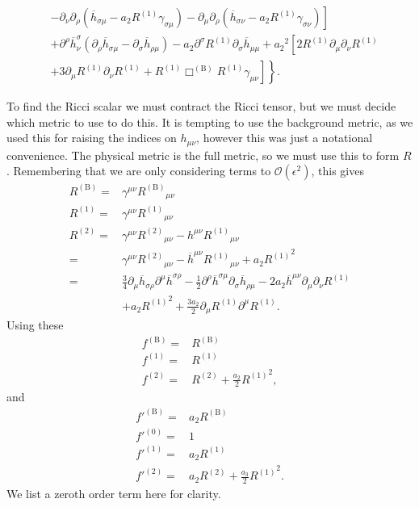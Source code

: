 \documentclass[a4paper, 11pt, titlepage, twoside]{report}
\newcommand{\recip}[1]{\ensuremath{\frac{1}{#1}}}
\newcommand{\order}[1]{\ensuremath{\mathcal{O}({#1})}}
\begin{document}
{\begin{align}
 & - \left.\left. \partial_\nu\partial_\rho\left(\overline{h}_{\sigma\mu} - a_2 R^{(1)} \gamma_{\sigma\mu}\right) - \partial_\mu\partial_\rho\left(\overline{h}_{\sigma\nu} - a_2 R^{(1)} \gamma_{\sigma\nu}\right)\right] \right. \nonumber \\
 & + \left. \partial^\rho\overline{h}^\sigma_\nu\left(\partial_\rho\overline{h}_{\sigma\mu} - \partial_\sigma\overline{h}_{\rho\mu}\right) - a_2 \partial^\sigma R^{(1)}\partial_\sigma\overline{h}_{\mu\mu} + {a_2}^2 \left[2R^{(1)}\partial_\mu\partial_\nu R^{(1)} \right.\right. \nonumber \\
 & + \left.\left. 3\partial_\mu R^{(1)}\partial_\nu R^{(1)} + R^{(1)} \Box^{(\mathrm{B})} R^{(1)} \gamma_{\mu\nu}\right]\right\}.
\end{align}

To find the Ricci scalar we must contract the Ricci tensor, but we must decide which metric to use to do this. It is tempting to use the background metric, as we used this for raising the indices on $h_{\mu\nu}$, however this was just a notational convenience. The physical metric is the full metric, so we must use this to form $R$. Remembering that we are only considering terms to $\order{\epsilon^2}$, this gives
\begin{align}
R^{(\mathrm{B})} = {} & \gamma^{\mu\nu} {R^{(\mathrm{B})}}_{\mu\nu} \\
R^{(1)} = {} & \gamma^{\mu\nu} {R^{(1)}}_{\mu\nu} \\
R^{(2)} = {} & \gamma^{\mu\nu} {R^{(2)}}_{\mu\nu} - h^{\mu\nu} {R^{(1)}}_{\mu\nu} \nonumber \\
 = {} & \gamma^{\mu\nu} {R^{(2)}}_{\mu\nu} - \overline{h}^{\mu\nu} {R^{(1)}}_{\mu\nu} + a_2 {R^{(1)}}^2 \nonumber \\
 = {} & \frac{3}{4}\partial_\mu\overline{h}_{\sigma\rho}\partial^\mu\overline{h}^{\sigma\rho} - \recip{2} \partial^\rho\overline{h}^{\sigma\mu}\partial_\sigma\overline{h}_{\rho\mu} - 2a_2 \overline{h}^{\mu\nu}\partial_\mu\partial_\nu R^{(1)} \nonumber \\
 & + {} a_2 {R^{(1)}}^2 + \frac{3a_2}{2}\partial_\mu R^{(1)} \partial^\mu R^{(1)}.
\end{align}
Using these
\begin{align}
f^{(\mathrm{B})} = {} & R^{(\mathrm{B})} \\
f^{(1)} = {} & R^{(1)} \\
f^{(2)} = {} & R^{(2)} + \frac{a_2}{2}{R^{(1)}}^2,
\end{align}
and
\begin{align}
f'^{(\mathrm{B})} = {} & a_2 R^{(\mathrm{B})} \\
f'^{(0)} = {} & 1 \\
f'^{(1)} = {} & a_2 R^{(1)} \\
f'^{(2)} = {} & a_2 R^{(2)} + \frac{a_3}{2}{R^{(1)}}^2.
\end{align}
We list a zeroth order term here for clarity.

}
\end{document}
